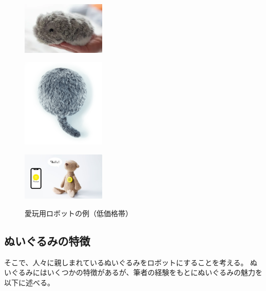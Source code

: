 \documentclass[uplatex,a4paper,12pt]{jsarticle}
\begin{document}
\begin{figure}[htbp]
  \centering
  \begin{minipage}[c]{0.32\linewidth}
    \centering
    \includegraphics[keepaspectratio,width=4cm,clip]{images/previous_robots/moflin.png}
    \label{fig:moflin}
  \end{minipage}
  \begin{minipage}[c]{0.32\linewidth}
    \centering
    \includegraphics[keepaspectratio,width=4cm,clip]{images/previous_robots/qoobo.png}
    \label{fig:qoobo}
  \end{minipage}
  \begin{minipage}[c]{0.32\linewidth}
    \centering
    \includegraphics[keepaspectratio,width=4cm,clip]{images/previous_robots/pechat.jpg}
    \label{fig:pechat}
  \end{minipage}
  \caption{愛玩用ロボットの例（低価格帯）}
  \label{fig:previous_robots_inexpensive}
\end{figure}


\subsection{ぬいぐるみの特徴}

そこで、人々に親しまれているぬいぐるみをロボットにすることを考える。
ぬいぐるみにはいくつかの特徴があるが、筆者の経験をもとにぬいぐるみの魅力を以下に述べる。
\end{document}
